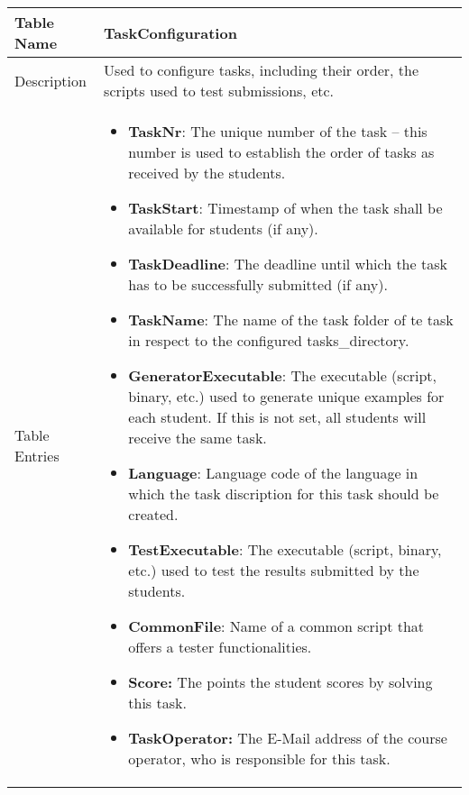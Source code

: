 \begin{tabular}{|p{3cm}|p{10cm}|}
\hline
Table Name & TaskConfiguration \\
\hline
Description & Used to configure tasks, including their order, the scripts used to test
	submissions, etc.\\
\hline
Table Entries & \begin{itemize}
    \item {\bf TaskNr}: The unique number of the task -- this number is used to establish
		the order of tasks as received by the students.
    \item {\bf TaskStart}: Timestamp of when the task shall be available for students
		(if any).
    \item {\bf TaskDeadline}: The deadline until which the task has to be successfully
		submitted (if any).
    \item {\bf TaskName}: The name of the task folder of te task in respect to the
	configured tasks\_directory.
    \item {\bf GeneratorExecutable}: The executable (script, binary, etc.) used to
		generate unique examples for each student. If this is not set, all students will
		receive the same task.
	\item {\bf Language}: Language code of the language in which the task discription for
		this task should be created.
    \item {\bf TestExecutable}: The executable (script, binary, etc.) used to test the
		results submitted by the students.
	\item {\bf CommonFile}: Name of a common script that offers a tester functionalities.
    \item {\bf Score:} The points the student scores by solving this task.
    \item {\bf TaskOperator:} The E-Mail address of the course operator, who is
		responsible for this task.
    \end{itemize}

\\
\hline
\end{tabular}

